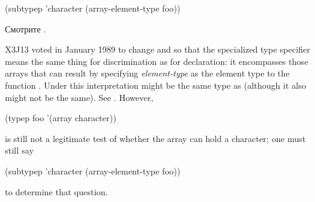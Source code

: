 \begin{flushdesc}
  \begin{lisp}
    (subtypep 'character (array-element-type foo))
  \end{lisp}
  Смотрите .
\begin{new}
X3J13 voted in January 1989
to change  and 
so that the specialized  type specifier
means the same thing for discrimination
as for declaration: it encompasses those arrays
that can result by specifying \emph{element-type} as the element type
to the function .
Under this interpretation  might be
the same type as 
(although it also might not be the same).
See .
However,
\begin{lisp}
(typep foo '(array character))
\end{lisp}
is still not a legitimate test of whether the array
 can hold a character; one must still say
\begin{lisp}
(subtypep 'character (array-element-type foo))
\end{lisp}
to determine that question.


\end{new}
\end{flushdesc}

